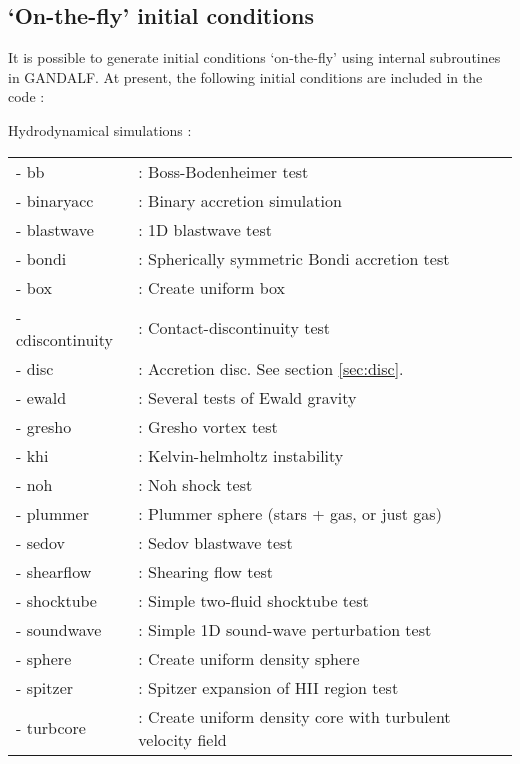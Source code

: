\documentclass[a4paper]{article}
\begin{document}
\subsection{`On-the-fly' initial conditions}

It is possible to generate initial conditions `on-the-fly' using internal subroutines in GANDALF.  At present, the following initial conditions are included in the code : \newline

\noindent Hydrodynamical simulations : \\
\newline
\begin{tabular}{ll}
- bb             &: Boss-Bodenheimer test \\
- binaryacc      &: Binary accretion simulation \\
- blastwave      &: 1D blastwave test \\
- bondi          &: Spherically symmetric Bondi accretion test \\
- box            &: Create uniform box \\
- cdiscontinuity &: Contact-discontinuity test \\
- disc &: Accretion disc. See section \ref{sec:disc}. \\
- ewald          &: Several tests of Ewald gravity \\
- gresho         &: Gresho vortex test \\
- khi            &: Kelvin-helmholtz instability \\
- noh            &: Noh shock test \\
- plummer        &: Plummer sphere (stars + gas, or just gas) \\
- sedov          &: Sedov blastwave test \\
- shearflow      &: Shearing flow test \\
- shocktube      &: Simple two-fluid shocktube test \\
- soundwave      &: Simple 1D sound-wave perturbation test \\
- sphere         &: Create uniform density sphere \\
- spitzer        &: Spitzer expansion of HII region test \\
- turbcore       &: Create uniform density core with turbulent velocity field
\end{tabular}
\newline
\newline
\end{document}
